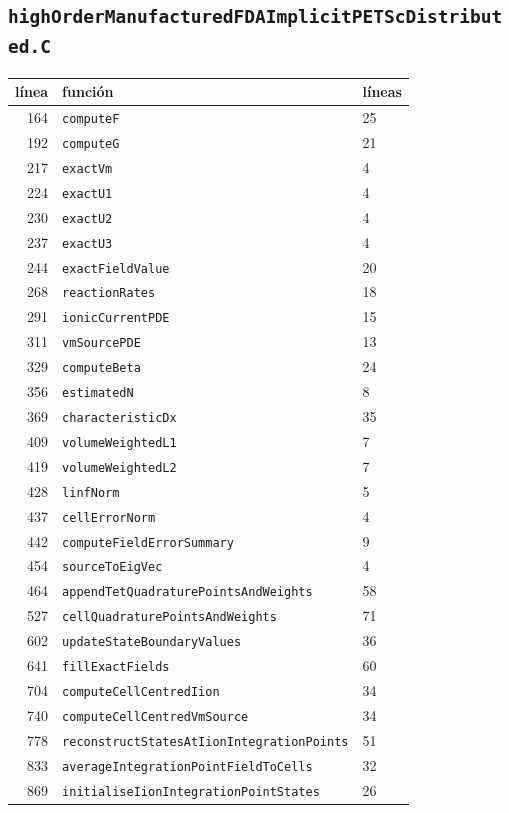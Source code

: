 \documentclass[11pt,a4paper]{article}
\begin{document}
\subsection*{\texttt{highOrderManufacturedFDAImplicitPETScDistributed.C}}
\begin{longtable}{rll}
\toprule
línea & función & líneas \\
\midrule
\endhead
164 & \texttt{computeF} & 25 \\
192 & \texttt{computeG} & 21 \\
217 & \texttt{exactVm} & 4 \\
224 & \texttt{exactU1} & 4 \\
230 & \texttt{exactU2} & 4 \\
237 & \texttt{exactU3} & 4 \\
244 & \texttt{exactFieldValue} & 20 \\
268 & \texttt{reactionRates} & 18 \\
291 & \texttt{ionicCurrentPDE} & 15 \\
311 & \texttt{vmSourcePDE} & 13 \\
329 & \texttt{computeBeta} & 24 \\
356 & \texttt{estimatedN} & 8 \\
369 & \texttt{characteristicDx} & 35 \\
409 & \texttt{volumeWeightedL1} & 7 \\
419 & \texttt{volumeWeightedL2} & 7 \\
428 & \texttt{linfNorm} & 5 \\
437 & \texttt{cellErrorNorm} & 4 \\
442 & \texttt{computeFieldErrorSummary} & 9 \\
454 & \texttt{sourceToEigVec} & 4 \\
464 & \texttt{appendTetQuadraturePointsAndWeights} & 58 \\
527 & \texttt{cellQuadraturePointsAndWeights} & 71 \\
602 & \texttt{updateStateBoundaryValues} & 36 \\
641 & \texttt{fillExactFields} & 60 \\
704 & \texttt{computeCellCentredIion} & 34 \\
740 & \texttt{computeCellCentredVmSource} & 34 \\
778 & \texttt{reconstructStatesAtIionIntegrationPoints} & 51 \\
833 & \texttt{averageIntegrationPointFieldToCells} & 32 \\
869 & \texttt{initialiseIionIntegrationPointStates} & 26 \\

\end{longtable}
\end{document}
